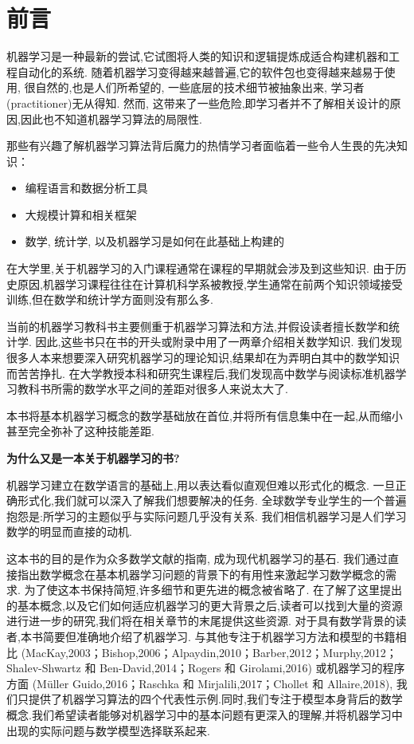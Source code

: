 \chapter{前言}

机器学习是一种最新的尝试,它试图将人类的知识和逻辑提炼成适合构建机器和工程自动化的系统.
随着机器学习变得越来越普遍,它的软件包也变得越来越易于使用,
很自然的,也是人们所希望的, 一些底层的技术细节被抽象出来, 学习者(practitioner)无从得知.
然而, 这带来了一些危险,即学习者并不了解相关设计的原因,因此也不知道机器学习算法的局限性.

那些有兴趣了解机器学习算法背后魔力的热情学习者面临着一些令人生畏的先决知识：

\begin{itemize}
	\item 编程语言和数据分析工具
	\item 大规模计算和相关框架
	\item 数学, 统计学, 以及机器学习是如何在此基础上构建的
\end{itemize}

在大学里,关于机器学习的入门课程通常在课程的早期就会涉及到这些知识. 
由于历史原因,机器学习课程往往在计算机科学系被教授,学生通常在前两个知识领域接受训练,但在数学和统计学方面则没有那么多.

当前的机器学习教科书主要侧重于机器学习算法和方法,并假设读者擅长数学和统计学. 
因此,这些书只在书的开头或附录中用了一两章介绍相关数学知识. 
我们发现很多人本来想要深入研究机器学习的理论知识,结果却在为弄明白其中的数学知识而苦苦挣扎. 
在大学教授本科和研究生课程后,我们发现高中数学与阅读标准机器学习教科书所需的数学水平之间的差距对很多人来说太大了.

本书将基本机器学习概念的数学基础放在首位,并将所有信息集中在一起,从而缩小甚至完全弥补了这种技能差距.

\begin{center}
	\textbf{为什么又是一本关于机器学习的书?}
\end{center}

机器学习建立在数学语言的基础上,用以表达看似直观但难以形式化的概念. 
一旦正确形式化,我们就可以深入了解我们想要解决的任务.
全球数学专业学生的一个普遍抱怨是:所学习的主题似乎与实际问题几乎没有关系.
我们相信机器学习是人们学习数学的明显而直接的动机.

这本书的目的是作为众多数学文献的指南, 成为现代机器学习的基石.
我们通过直接指出数学概念在基本机器学习问题的背景下的有用性来激起学习数学概念的需求.
为了使这本书保持简短,许多细节和更先进的概念被省略了.
在了解了这里提出的基本概念,以及它们如何适应机器学习的更大背景之后,读者可以找到大量的资源进行进一步的研究,我们将在相关章节的末尾提供这些资源.
对于具有数学背景的读者,本书简要但准确地介绍了机器学习.
与其他专注于机器学习方法和模型的书籍相比
(MacKay,2003；Bishop,2006；Alpaydin,2010；Barber,2012；Murphy,2012；Shalev-Shwartz 和 Ben-David,2014；Rogers 和 Girolami,2016)
或机器学习的程序方面
(Müller Guido,2016；Raschka 和 Mirjalili,2017；Chollet 和 Allaire,2018),
我们只提供了机器学习算法的四个代表性示例.同时,我们专注于模型本身背后的数学概念.我们希望读者能够对机器学习中的基本问题有更深入的理解,并将机器学习中出现的实际问题与数学模型选择联系起来.


